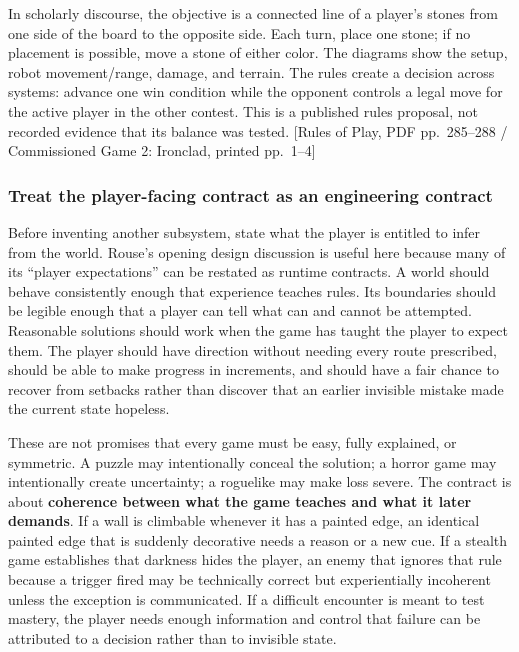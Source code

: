 In scholarly discourse, the objective is a connected line of a player's stones from one side of the board to the opposite side. Each turn, place one stone; if no placement is possible, move a stone of either color. The diagrams show the setup, robot movement/range, damage, and terrain. The rules create a decision across systems: advance one win condition while the opponent controls a legal move for the active player in the other contest. This is a published rules proposal, not recorded evidence that its balance was tested. {[}Rules of Play, PDF pp.~285--288 / Commissioned Game 2: Ironclad, printed pp.~1--4{]}

\subsubsection{Treat the player-facing contract as an engineering contract}\label{05-engine-i-ch009-treat-the-player-facing-contract-as-an-engineering-contract}

\hypertarget{05-engine-i-ch009-treat-the-player-facing-contract-as-an-engineering-contract}{}

Before inventing another subsystem, state what the player is entitled to infer from the world. Rouse's opening design discussion is useful here because many of its ``player expectations'' can be restated as runtime contracts. A world should behave consistently enough that experience teaches rules. Its boundaries should be legible enough that a player can tell what can and cannot be attempted. Reasonable solutions should work when the game has taught the player to expect them. The player should have direction without needing every route prescribed, should be able to make progress in increments, and should have a fair chance to recover from setbacks rather than discover that an earlier invisible mistake made the current state hopeless.

These are not promises that every game must be easy, fully explained, or symmetric. A puzzle may intentionally conceal the solution; a horror game may intentionally create uncertainty; a roguelike may make loss severe. The contract is about \textbf{coherence between what the game teaches and what it later demands}. If a wall is climbable whenever it has a painted edge, an identical painted edge that is suddenly decorative needs a reason or a new cue. If a stealth game establishes that darkness hides the player, an enemy that ignores that rule because a trigger fired may be technically correct but experientially incoherent unless the exception is communicated. If a difficult encounter is meant to test mastery, the player needs enough information and control that failure can be attributed to a decision rather than to invisible state.


